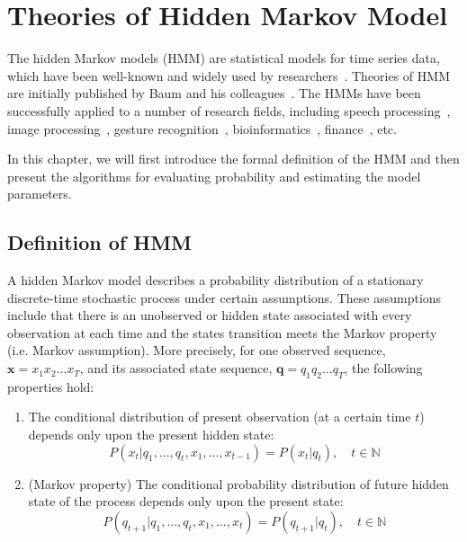 \documentclass[12pt,final,twoside]{report}
\begin{document}
\cleardoublepage
\chapter{Theories of Hidden Markov Model}
\label{ch:hmm}
The hidden Markov models (HMM) are statistical models for time series data, which have been well-known and widely used by researchers~\cite{rabiner_tutorial_1989, rabiner_fundamentals_1993}. Theories of HMM are initially published by Baum and his colleagues~\cite{baum_statistical_1966, baum_maximization_1970}. The HMMs have been successfully applied to a number of research fields, including speech processing~\cite{baker_dragon_1975, rabiner_fundamentals_1993}, image processing~\cite{chen_off-line_1994}, gesture recognition~\cite{mitra_gesture_2007}, bioinformatics~\cite{koski_hidden_2001}, finance~\cite{bhar_hidden_2004}, etc.

In this chapter, we will first introduce the formal definition of the HMM and then present the algorithms for evaluating probability and estimating the model parameters.

\section{Definition of HMM} \label{sec:hmm}
A hidden Markov model describes a probability distribution of a stationary discrete-time stochastic process under certain assumptions. These assumptions include that there is an unobserved or hidden state associated with every observation at each time and the states transition meets the Markov property (i.e. Markov assumption). More precisely, for one observed sequence, $\mathbf{x} = x_1 x_2 \dots x_T$, and its associated state sequence, $\mathbf{q} = q_1 q_2 \dots q_T$, the following properties hold:

\begin{enumerate}
  \item The conditional distribution of present observation (at a certain time $t$) depends only upon the present hidden state:
    \begin{equation}
      P(x_t|q_1, \dots, q_t, x_1, \dots, x_{t-1}) = P(x_t|q_t), \quad t \in \mathbb{N} 
      \label{eq:ob_prob}
    \end{equation}
  \item (Markov property) The conditional probability distribution of future hidden state of the process depends only upon the present state:
    \begin{equation}
      P(q_{t+1}|q_1, \dots, q_t, x_1, \dots, x_t) = P(q_{t+1}|q_t),\quad t \in \mathbb{N}
      \label{eq:markov_prop}
    \end{equation}
\end{enumerate}
\end{document}
